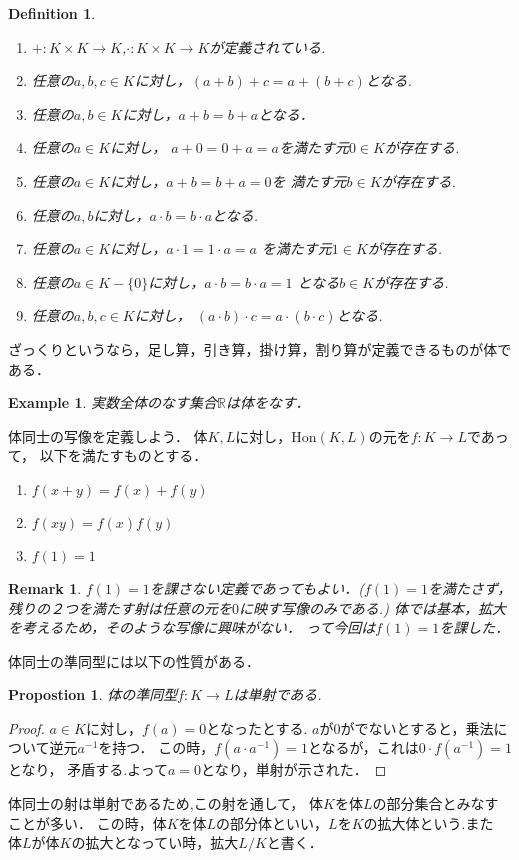\documentclass{ujarticle}
\newtheorem{dfn}[thm]{Definition}
\newtheorem{prop}[thm]{Propostion}
\newtheorem{epl}[thm]{Example}
\newtheorem*{rem}{Remark}
\begin{document}
\begin{dfn}
  \begin{enumerate}
    \setlength{\parskip}{0cm} %
    \setlength{\itemsep}{0cm} %
    \item $+:K \times K \to K$,$\cdot:K \times K \to K $が定義されている.
    \item 任意の$a,b,c \in K$に対し，$(a + b) +c =a +(b +c)$となる.
    \item 任意の$a,b \in K$に対し，$a + b = b + a$となる．
    \item 任意の$a \in K$に対し，
              $a + 0 =  0 + a = a$を満たす元$0 \in K$が存在する.
    \item 任意の$a \in K$に対し，$a + b = b + a =0$を
             満たす元$b \in K $が存在する.
    \item 任意の$a,b$に対し，$a \cdot b = b \cdot a$となる.
    \item 任意の$a \in K$に対し，$a \cdot 1 = 1 \cdot a =a$
              を満たす元$1 \in K$が存在する.
    \item 任意の$a \in K-\{0\}$に対し，$a \cdot b = b \cdot a = 1$
              となる$b \in K$が存在する.
    \item 任意の$a,b,c \in K$に対し，
              $(a \cdot b) \cdot c =a \cdot (b \cdot c)$となる.
  \end{enumerate}
\end{dfn}

ざっくりというなら，足し算，引き算，掛け算，割り算が定義できるものが体である．

\begin{epl}
 実数全体のなす集合$\mathbb{R}$は体をなす．
\end{epl}

体同士の写像を定義しよう．
体$K,L$に対し，$\mathrm{Hon}(K,L)$の元を$f:K \to L$であって，
以下を満たすものとする．
\begin{enumerate}
  \item $f(x + y)= f(x) + f(y)$
  \item $f(xy)=f(x)f(y)$
  \item $f(1)=1$
\end{enumerate}
\begin{rem}
 $f(1)=1$を課さない定義であってもよい．($f(1)=1$を満たさず，
 残りの２つを満たす射は任意の元を$0$に映す写像のみである.)
 体では基本，拡大を考えるため，そのような写像に興味がない．
 って今回は$f(1)=1$を課した．
\end{rem}
体同士の準同型には以下の性質がある．
\begin{prop}
 体の準同型$f:K \to L$は単射である.
\end{prop}
\begin{proof}
  $a \in K$に対し，$f(a)=0$となったとする.
  $a$が$0$がでないとすると，乗法について逆元$a^{-1}$を持つ．
  この時，$f(a \cdot a^{-1})=1$となるが，これは$0 \cdot f(a^{-1})=1$となり，
  矛盾する.よって$a=0$となり，単射が示された．
\end{proof}
体同士の射は単射であるため,この射を通して，
体$K$を体$L$の部分集合とみなすことが多い．
この時，体$K$を体$L$の部分体といい，$L$を$K$の拡大体という.また
体$L$が体$K$の拡大となってい時，拡大$L/K$と書く．
\end{document}

